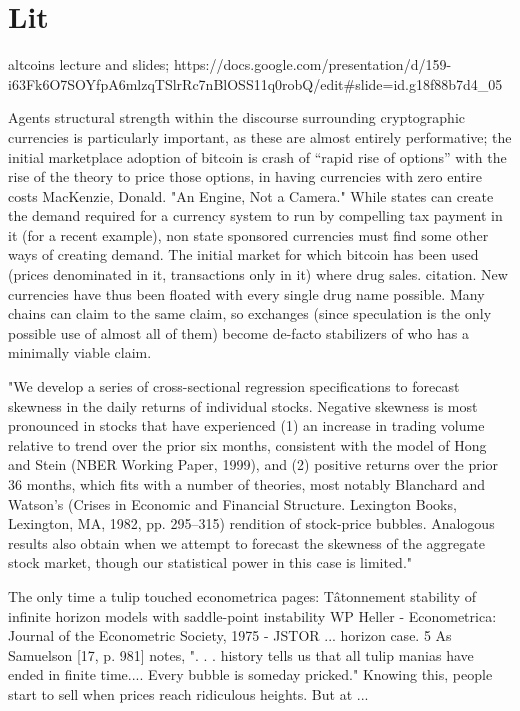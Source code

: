 \section{Lit}

altcoins lecture and slides;
https://docs.google.com/presentation/d/159-i63Fk6O7SOYfpA6mlzqTSlrRc7nBlOSS11q0robQ/edit#slide=id.g18f88b7d4_05



Agents structural strength within the discourse surrounding cryptographic currencies is particularly important, as these are almost entirely performative; the initial marketplace adoption of bitcoin is 
crash of  %
“rapid rise of options” with the rise of the theory to price those options, in having currencies with zero entire costs
MacKenzie, Donald. "An Engine, Not a Camera."
While states can create the demand required for a currency system to run by compelling tax payment in it (for a recent example), non state sponsored currencies must find some other ways of creating demand.
The initial market for which bitcoin has been used (prices denominated in it, transactions only in it) where drug sales. citation.
New currencies have thus been floated with every single drug name possible. Many chains can claim to the same claim, so exchanges (since speculation is the only possible use of almost all of them) become de-facto stabilizers of who has a minimally viable claim. 





"We develop a series of cross-sectional regression specifications to forecast skewness in the daily returns of individual stocks. Negative skewness is most pronounced in stocks that have experienced (1) an increase in trading volume relative to trend over the prior six months, consistent with the model of Hong and Stein (NBER Working Paper, 1999), and (2) positive returns over the prior 36 months, which fits with a number of theories, most notably Blanchard and Watson's (Crises in Economic and Financial Structure. Lexington Books, Lexington, MA, 1982, pp. 295–315) rendition of stock-price bubbles. Analogous results also obtain when we attempt to forecast the skewness of the aggregate stock market, though our statistical power in this case is limited."



The only time a tulip touched econometrica pages:
Tâtonnement stability of infinite horizon models with saddle-point instability
WP Heller - Econometrica: Journal of the Econometric Society, 1975 - JSTOR
... horizon case. 5 As Samuelson [17, p. 981] notes, ". . . history tells us that all tulip
manias have ended in finite time.... Every bubble is someday pricked." Knowing this,
people start to sell when prices reach ridiculous heights. But at ... 




